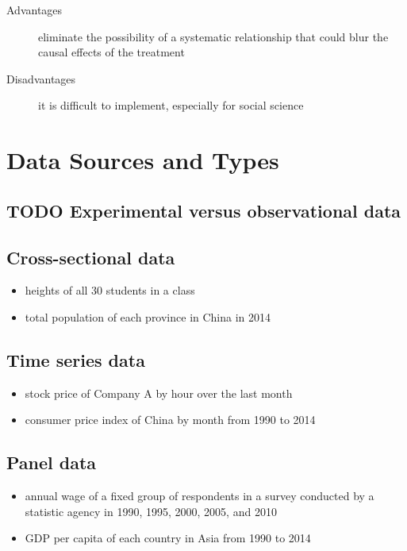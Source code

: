 \documentclass[a4paper,11pt]{article}
\begin{document}
\begin{description}
\item[{Advantages}] eliminate the possibility of a systematic relationship that could
blur the causal effects of the treatment

\item[{Disadvantages}] it is difficult to implement, especially for social
science
\end{description}


\section{Data Sources and Types}
\label{sec:orgbcf84cf}
\subsection{{\bfseries\sffamily TODO} Experimental versus observational data}
\label{sec:orga24cd4a}

\subsection{Cross-sectional data}
\label{sec:orgd15641b}

\begin{itemize}
\item heights of all 30 students in a class

\item total population of each province in China in 2014
\end{itemize}

\subsection{Time series data}
\label{sec:org6b96512}

\begin{itemize}
\item stock price of Company A by hour over the last month

\item consumer price index of China by month from 1990 to 2014
\end{itemize}

\subsection{Panel data}
\label{sec:org27217ba}

\begin{itemize}
\item annual wage of a fixed group of respondents in a survey conducted by
a statistic agency in 1990, 1995, 2000, 2005, and 2010

\item GDP per capita of each country in Asia from 1990 to 2014
\end{itemize}
\end{document}
